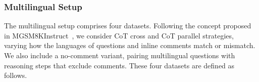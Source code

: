 \subsubsection{Multilingual Setup}


The multilingual setup comprises four datasets.
%
Following the concept proposed in MGSM8KInstruct~\cite{mathoctopus}, we consider CoT cross and CoT parallel strategies, varying how the languages of questions and inline comments match or mismatch.
%
%    
%
We also include a no-comment variant, pairing multilingual questions with reasoning steps that exclude comments.
%
These four datasets are defined as follows. 
%

